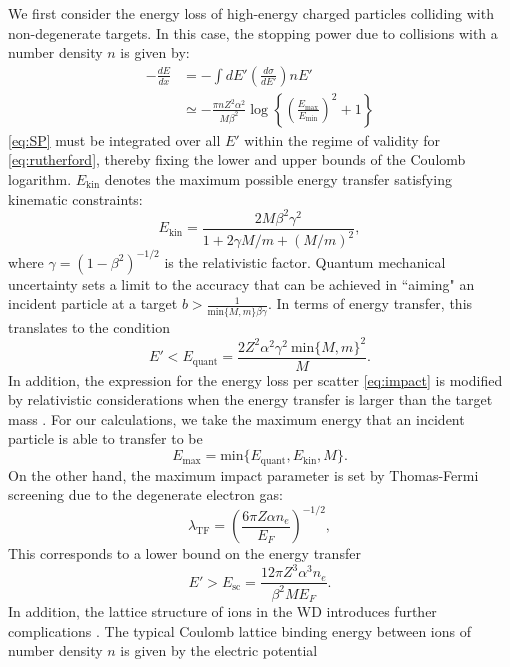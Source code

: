 \documentclass[twocolumn,showpacs,preprintnumbers,amsmath,amssymb,prd]{revtex4}
\def\r{\right)}
\def\l{\left(}
\begin{document}
\begin{appendices}
We first consider the energy loss of high-energy charged particles colliding with non-degenerate targets. In this case, the stopping power due to collisions with a number density $n$ is given by:
\begin{align}
\label{eq:SP}
-\frac{dE}{dx} & = - \int dE' \left(\frac{d \sigma}{dE'}\right) n E' \\
& \simeq -\frac{\pi n Z^2 \alpha^2}{M \beta^2} \log\left\{{\l\frac{E_{\text{max}}}{E_{\text{min}}}\r}^2+1\right\}
\end{align}
\eqref{eq:SP} must be integrated over all $E'$ within the regime of validity for \eqref{eq:rutherford}, thereby fixing the lower and upper bounds of the Coulomb logarithm. $E_{\text{kin}}$ denotes the maximum possible energy transfer satisfying kinematic constraints:
\begin{equation}
E_{\text{kin}} = \frac{2 M \beta^2 \gamma^2}{1+ 2\gamma M/m +(M/m)^2},
\end{equation}
where $\gamma = (1-\beta^2)^{-1/2}$ is the relativistic factor. Quantum mechanical uncertainty sets a limit to the accuracy that can be achieved in ``aiming" an incident particle at a target $b > \frac{1}{\text{min}\{{M, m}\} \beta \gamma}$. In terms of energy transfer, this translates to the condition
\begin{equation}
E' < E_\text{quant} = \frac{2 Z^2 \alpha^2 \gamma^2 ~\text{min}\{{M, m}\}^2}{M}.
\end{equation}
In addition, the expression for the energy loss per scatter \eqref{eq:impact} is modified by relativistic considerations when the energy transfer is larger than the target mass \cite{Rossi}. For our calculations, we take the maximum energy that an incident particle is able to transfer to be
\begin{equation}
E_{\text{max}} = \text{min}\{E_\text{quant}, E_{\text{kin}}, M\}.
\end{equation}
On the other hand, the maximum impact parameter is set by Thomas-Fermi screening due to the degenerate electron gas:
\begin{equation}
\lambda_{\text{TF}} = \l \frac{6 \pi Z \alpha n_e}{E_F}\r^{-1/2},
\end{equation}
This corresponds to a lower bound on the energy transfer
\begin{equation}
E' > E_{\text{sc}} = \frac{12 \pi Z^3 \alpha ^3 n_e}{\beta^2 M E_F}.
\end{equation}
In addition, the lattice structure of ions in the WD introduces further complications \cite{Teukolsky}. The typical Coulomb lattice binding energy between ions of number density $n$ is given by the electric potential

\end{appendices}
\end{document}
